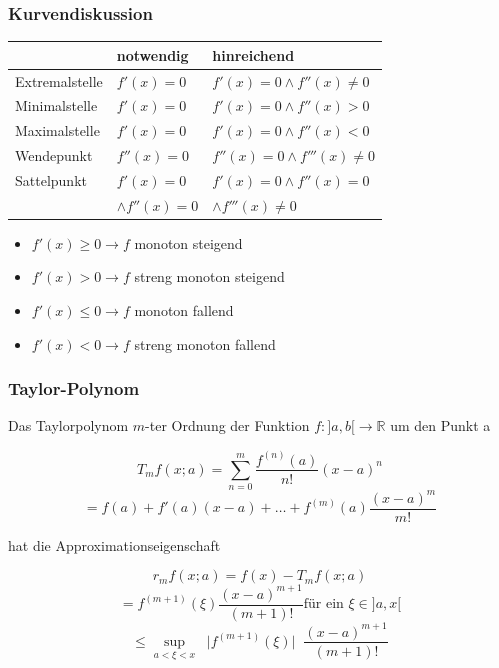 \documentclass[6pt]{article}
\begin{document}
\begin{multicols*}{3}
	
	\subsubsection*{Kurvendiskussion}
		\begin{tabular}{lll}
		& notwendig & hinreichend \\ \hline
		Extremalstelle  & $f'(x) = 0$  \hspace{5mm} & $f'(x) = 0 \wedge f''(x) \neq 0$ \\
		Minimalstelle   & $f'(x) = 0 $ & $f'(x) = 0 \wedge  f''(x) > 0$\\
		Maximalstelle   & $f'(x) = 0 $ & $f'(x) = 0 \wedge  f''(x) < 0$ \\
		Wendepunkt      & $f''(x) = 0 $ & $f''(x) = 0 \wedge  f'''(x) \neq 0$ \\
		Sattelpunkt     & $f'(x) = 0 $ & $f'(x) = 0 \wedge  f''(x) = 0$ \\
								&$\wedge  f''(x) = 0$	& $\wedge  f'''(x) \neq 0$
	\end{tabular}

	\begin{itemize}[itemsep=1pt, parsep=2pt]
		\item $f'(x) \geq  0 \rightarrow f $ monoton steigend
		\item $f'(x) > 0 \rightarrow f $ streng monoton steigend
		\item $f'(x) \leq 0 \rightarrow f $ monoton fallend
		\item $f'(x) < 0 \rightarrow f $ streng monoton fallend 
	\end{itemize}



	\subsubsection*{Taylor-Polynom}
		Das Taylorpolynom $m$-ter Ordnung der Funktion $f:]a,b[ \to \mathbb{R}$ um den Punkt a
		

					\[ T_mf(x;a) = \sum_{n=0}^m \frac{f^{(n)}(a)}{n!}(x-a)^n \] 
					\[= f(a) + f'(a)(x-a) + \ldots + f^{(m)}(a) \frac{(x-a)^m}{m!}	\]
					
					hat die Approximationseigenschaft
					
					\[ r_mf(x;a) = f(x) - T_mf(x;a)\]   
					\[ = f^{(m+1)}(\xi) \frac{(x-a)^{m+1}}{(m+1)!} \text{f{\"u}r ein }\xi \in ]a,x[\] 
					\[ \leq \underset{a < \xi < x} { \sup} \; \; \big | f^{(m+1)}(\xi) \big | \; \;	\frac{(x-a)^{m+1}}{(m+1)!}  \]


\end{multicols*}
\end{document}
